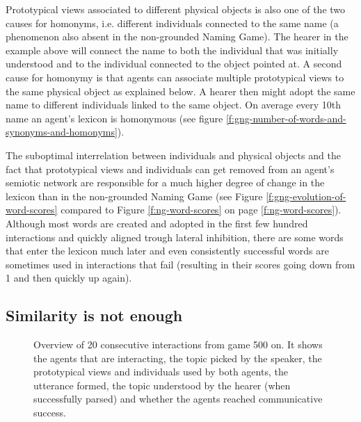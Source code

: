 Prototypical views associated to different physical objects is also
one of the two causes for homonyms, i.e. different individuals
connected to the same name (a phenomenon also absent in the
non-grounded Naming Game). The hearer in the example above will
connect the name to both the individual that was initially understood
and to the individual connected to the object pointed at. A second
cause for homonymy is that agents can associate multiple prototypical
views to the same physical object as explained below. A hearer then
might adopt the same name to different individuals linked to the same
object. On average every 10th name an agent's lexicon is homonymous
(see figure \ref{f:gng-number-of-words-and-synonyms-and-homonyms}).


The suboptimal interrelation between individuals and physical objects
and the fact that prototypical views and individuals can get removed
from an agent's semiotic network are responsible for a much higher
degree of change in the lexicon than in the non-grounded Naming Game
(see Figure \ref{f:gng-evolution-of-word-scores} compared to
Figure \ref{f:ng-word-scores} on page
\ref{f:ng-word-scores}). Although most words are created and adopted
in the first few hundred interactions and quickly aligned trough
lateral inhibition, there are some words that enter the lexicon much
later and even consistently successful words are sometimes used in
interactions that fail (resulting in their scores going down from 1
and then quickly up again).




\subsection{Similarity is not enough}

\begin{figure}[p]
   {}
  \caption{Overview of 20 consecutive interactions from game 500
    on. It shows the agents that are interacting, the topic picked by
    the speaker, the prototypical views and individuals used by both
    agents, the utterance formed, the topic understood by the hearer
    (when successfully parsed) and whether the agents reached
    communicative success.}
  \label{f:gng-trace}
\end{figure}



